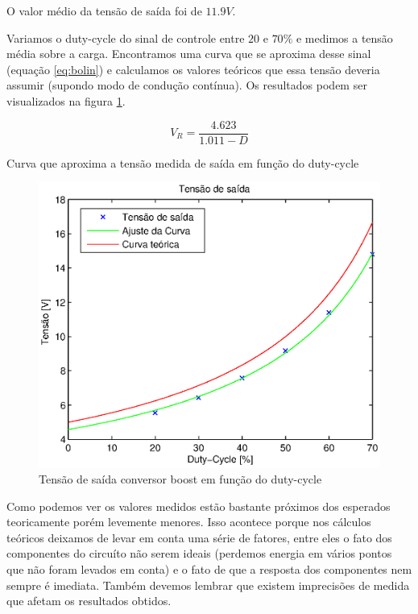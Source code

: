 \documentclass{article}
\begin{document}
O valor médio da tensão de saída foi de $11.9 V$.

Variamos o duty-cycle do sinal de controle entre $20$ e $70\%$ e medimos a tensão média sobre a carga. Encontramos uma curva que se aproxima desse sinal (equação \ref{eq:bolin}) e calculamos os valores teóricos que essa tensão deveria assumir (supondo modo de condução contínua). Os resultados podem ser visualizados na figura \ref{fig:botvd}.

\begin{capequ}
	\begin{equation}
	V_R = \frac{4.623}{1.011 - D}	
	\end{equation}
	\caption{Curva que aproxima a tensão medida de saída em função do duty-cycle}
	\label{eq:bolin}
\end{capequ}

\begin{figure}[H]
	\centering
	\includegraphics[width=0.7\linewidth]{Dados/boost/tvd}
	\caption{Tensão de saída conversor boost em função do duty-cycle}
	\label{fig:botvd}
\end{figure}

Como podemos ver os valores medidos estão bastante próximos dos esperados teoricamente porém levemente menores. Isso acontece porque nos cálculos teóricos deixamos de levar em conta uma série de fatores, entre eles o fato dos componentes do circuíto não serem ideais (perdemos energia em vários pontos que não foram levados em conta) e o fato de que a resposta dos componentes nem sempre é imediata. Também devemos lembrar que existem imprecisões de medida que afetam os resultados obtidos.


\end{document}
